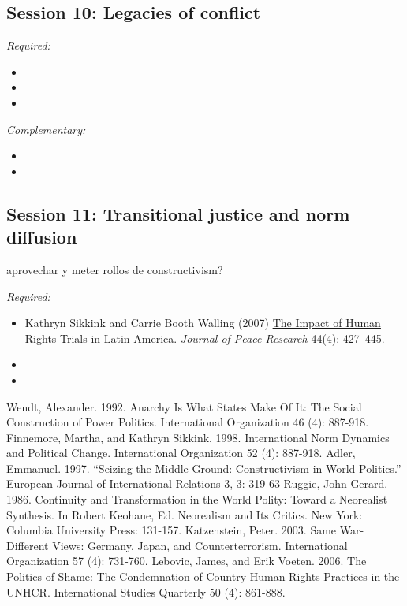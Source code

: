 \documentclass[12pt, a4paper]{article}
\begin{document}
\hline
\subsection*{Session 10: Legacies of conflict}

\noindent\textit{Required:}

\begin{itemize}
  \item
  \item
  \item
\end{itemize}

\noindent\textit{Complementary:}

\begin{itemize}
  \item
  \item
\end{itemize}

\hline
\subsection*{Session 11: Transitional justice and norm diffusion}

aprovechar y meter rollos de constructivism?

\noindent\textit{Required:}

\begin{itemize}
  \item Kathryn Sikkink and Carrie Booth Walling (2007) \href{https://doi.org/10.1177/002234330707895}{The Impact of Human Rights Trials in Latin America.} \textit{Journal of Peace Research} 44(4): 427--445.
  \item {\color{red}{Kim HJ. 2012. Structural determinants of human rights prosecutions after democratic transition. J. Peace Res. 49(2):305–20}}
  \item {\color{red}{Kim HJ, Sikkink K. 2010. Explaining the deterrence effect of human rights prosecutions for transitional countries. Int. Stud. Q. 54:939–63}}
\end{itemize}

Wendt, Alexander. 1992. Anarchy Is What States Make Of It: The Social Construction of Power
Politics. International Organization 46 (4): 887-918.
Finnemore, Martha, and Kathryn Sikkink. 1998. International Norm Dynamics and Political
Change. International Organization 52 (4): 887-918.
Adler, Emmanuel. 1997. “Seizing the Middle Ground: Constructivism in World Politics.”
European Journal of International Relations 3, 3: 319-63
Ruggie, John Gerard. 1986. Continuity and Transformation in the World Polity: Toward a
Neorealist Synthesis. In Robert Keohane, Ed. Neorealism and Its Critics. New York: Columbia University Press: 131-157.
Katzenstein, Peter. 2003. Same War-Different Views: Germany, Japan, and Counterterrorism.
International Organization 57 (4): 731-760.
Lebovic, James, and Erik Voeten. 2006. The Politics of Shame: The Condemnation of Country
Human Rights Practices in the UNHCR. International Studies Quarterly 50 (4): 861-888.
\end{document}
